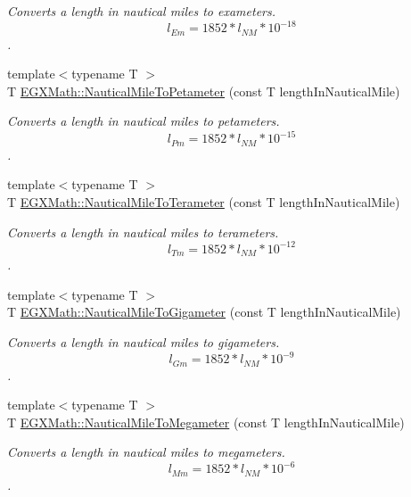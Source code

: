 \begin{DoxyCompactItemize}
\begin{DoxyCompactList}\small\item\em Converts a length in nautical miles to exameters. \[ l_{Em}=1852 * l_{NM} * 10^{-18} \]. \end{DoxyCompactList}\item 
{\footnotesize template$<$typename T $>$ }\\T \mbox{\hyperlink{group___e_g_x_math-_conversions-_length_conversions-_nautical-_nautical_mile-_s_i_ga89c2423e9ccfe76f9a9137060ac23e8d}{E\+G\+X\+Math\+::\+Nautical\+Mile\+To\+Petameter}} (const T length\+In\+Nautical\+Mile)
\begin{DoxyCompactList}\small\item\em Converts a length in nautical miles to petameters. \[ l_{Pm}=1852 * l_{NM} * 10^{-15} \]. \end{DoxyCompactList}\item 
{\footnotesize template$<$typename T $>$ }\\T \mbox{\hyperlink{group___e_g_x_math-_conversions-_length_conversions-_nautical-_nautical_mile-_s_i_gabd27057118659d507b698fc258ee5200}{E\+G\+X\+Math\+::\+Nautical\+Mile\+To\+Terameter}} (const T length\+In\+Nautical\+Mile)
\begin{DoxyCompactList}\small\item\em Converts a length in nautical miles to terameters. \[ l_{Tm}=1852 * l_{NM} * 10^{-12} \]. \end{DoxyCompactList}\item 
{\footnotesize template$<$typename T $>$ }\\T \mbox{\hyperlink{group___e_g_x_math-_conversions-_length_conversions-_nautical-_nautical_mile-_s_i_ga88b5a7dada605b923f1855f3ea4d4dc0}{E\+G\+X\+Math\+::\+Nautical\+Mile\+To\+Gigameter}} (const T length\+In\+Nautical\+Mile)
\begin{DoxyCompactList}\small\item\em Converts a length in nautical miles to gigameters. \[ l_{Gm}=1852 * l_{NM} * 10^{-9} \]. \end{DoxyCompactList}\item 
{\footnotesize template$<$typename T $>$ }\\T \mbox{\hyperlink{group___e_g_x_math-_conversions-_length_conversions-_nautical-_nautical_mile-_s_i_gabd190340a7a220633ebf73e06cba7e1a}{E\+G\+X\+Math\+::\+Nautical\+Mile\+To\+Megameter}} (const T length\+In\+Nautical\+Mile)
\begin{DoxyCompactList}\small\item\em Converts a length in nautical miles to megameters. \[ l_{Mm}=1852 * l_{NM} * 10^{-6} \]. \end{DoxyCompactList}\item 

\end{DoxyCompactItemize}
